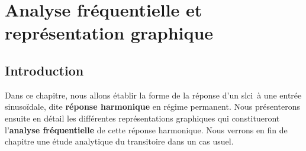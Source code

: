 \chapter[Analyse fréquentielle]
        {Analyse fréquentielle et représentation graphique\label{chap-repfreq}}
\minitoc
\newpage
\section{Introduction}
Dans ce chapitre, nous allons établir la forme de la réponse d'un \gls{slci}~à 
une entrée sinuso\"idale, dite \textbf{réponse harmonique} en régime permanent.
Nous présenterons ensuite en détail les différentes représentations graphiques 
qui constitueront l'\textbf{analyse fréquentielle} de cette réponse harmonique.
Nous verrons en fin de chapitre une étude analytique du transitoire 
dans un cas usuel.
